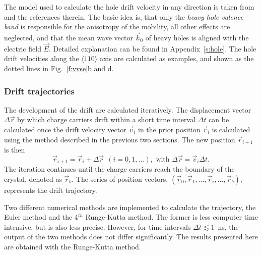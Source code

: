 \documentclass[epj]{svjour}
\begin{document}
The model used to calculate the hole drift velocity in any direction
is taken from \cite{bart} and the references therein. The basic idea
is, that only the \emph{heavy hole valence band} \cite{heavy} is
responsible for the anisotropy of the mobility, all other effects are
neglected, and that the mean wave vector $\vec{k}_{0}$ of heavy holes
is aligned with the electric field $\vec{E}$. Detailed explanation can
be found in Appendix~\ref{s:hole}. The hole drift velocities along the
$\langle 110 \rangle$ axis are calculated as examples, and shown as
the dotted lines in Fig.~\ref{f:vvse}b and d.

\subsubsection{Drift trajectories} 
\label{s:trj} 
The development of the drift are calculated iteratively. The
displacement vector $\Delta \vec{r}$ by which charge carriers drift
within a short time interval $\Delta t$ can be calculated once the
drift velocity vector $\vec{v}_{i}$ in the prior position
$\vec{r}_{i}$ is calculated using the method described in the previous
two sections.  The new position $\vec{r}_{i+1}$ is then
\begin{equation} 
\label{e:pos} 
\vec{r}_{i+1} = \vec{r}_{i} + \Delta \vec{r} \ \ 
(i=0,1,...), \mbox{ with } 
\Delta \vec{r} = \vec{v}_{i} \Delta t. 
\end{equation} 
The iteration continues until the charge carriers reach the boundary
of the crystal, denoted as $\vec{r}_{b}$. The series of position
vectors, $(\vec{r}_{0}, \vec{r}_{1}, ..., \vec{r}_{i}, ...,
\vec{r}_{b})$, represents the drift trajectory.
 
Two different numerical methods are implemented to calculate the
trajectory, the Euler method and the 4$^{th}$ Runge-Kutta method. The
former is less computer time intensive, but is also less precise.
However, for time intervals $\Delta t \lesssim 1$~ns, the output of
the two methods does not differ significantly. The results presented
here are obtained with the Runge-Kutta method.
 
\end{document}
